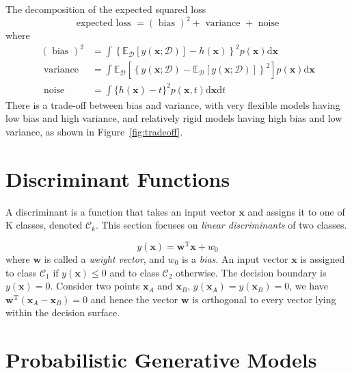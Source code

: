 \documentclass[5p,sort&compress]{elsarticle}
\begin{document}
The decomposition of the expected squared loss
\begin{equation}
\text { expected loss }=(\text { bias })^{2}+\text { variance }+\text { noise }
\end{equation}
where
\begin{equation}
\begin{aligned}(\text { bias })^{2} &=\int\left\{\mathbb{E}_{\mathcal{D}}[y(\mathbf{x} ; \mathcal{D})]-h(\mathbf{x})\right\}^{2} p(\mathbf{x}) \mathrm{d} \mathbf{x} \\ \text { variance } &=\int \mathbb{E}_{\mathcal{D}}\left[\left\{y(\mathbf{x} ; \mathcal{D})-\mathbb{E}_{\mathcal{D}}[y(\mathbf{x} ; \mathcal{D})]\right\}^{2}\right] p(\mathbf{x}) \mathrm{d} \mathbf{x} \\ \text { noise } &=\int\{h(\mathbf{x})-t\}^{2} p(\mathbf{x}, t) \mathrm{d} \mathbf{x} \mathrm{d} t \end{aligned}
\end{equation}
There is a trade-off between bias and variance, with very flexible models having low bias and high variance, and relatively rigid models having high bias and low variance, as shown in Figure~\ref{fig:tradeoff}.


\section{Discriminant Functions}

A discriminant is a function that takes an input vector $\boldsymbol{x}$ and assigns it to one of K classes, denoted $\mathcal{C}_k$. This section focuses on \textit{linear discriminants} of two classes.

\begin{equation}
y(\mathbf{x})=\mathbf{w}^{\mathrm{T}} \mathbf{x}+w_{0}
\end{equation}
where $\mathbf{w}$ is called a \textit{weight vector}, and $w_0$ is a \textit{bias}. An input vector $\mathbf{x}$ is assigned to class $\mathcal{C}_1$ if $y(\mathbf{x}) \leq 0$ and to class $\mathcal{C}_2$ otherwise. The decision boundary is $y(\mathbf{x}) = 0$. Consider two points $\mathbf{x}_A$ and $\mathbf{x}_B$, $y(\mathbf{x}_A) = y(\mathbf{x}_B) = 0$, we have $\mathbf{w}^{\mathrm{T}} (\mathbf{x}_A -\mathbf{x}_B) = 0$ and hence the vector $\mathbf{w}$ is orthogonal to every vector lying within the decision surface.



\section{Probabilistic Generative Models}
\end{document}
